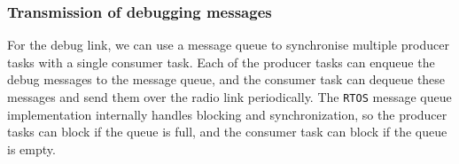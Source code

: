 \subsubsection*{Transmission of debugging messages}

For the debug link, we can use a message queue to synchronise multiple producer tasks with a single consumer task.
Each of the producer tasks can enqueue the debug messages to the message queue, and the consumer task can dequeue these messages and send them over the radio link periodically.
The \texttt{RTOS} message queue implementation internally handles blocking and synchronization, so the producer tasks can block if the queue is full, and the consumer task can block if the queue is empty.
